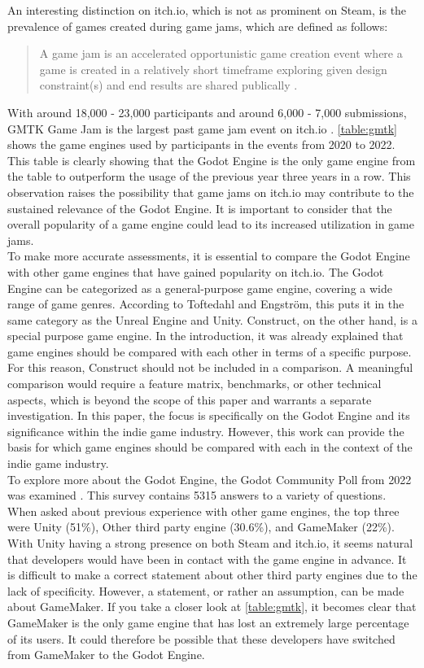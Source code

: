 An interesting distinction on itch.io, which is not as prominent on Steam, is the prevalence of games created during game jams, which are defined as follows:
\blockquote{A game jam is an accelerated opportunistic game creation event where a game is created in a relatively short timeframe exploring given design constraint(s) and end results are shared publically \cite{game-jam-definition}.}
With around 18,000 - 23,000 participants and around 6,000 - 7,000 submissions, GMTK Game Jam is the largest past game jam event on itch.io \cite{gmtk-game-jam-2021, gmtk-game-jam-2022, gmtk-game-jam-2023}.
\autoref{table:gmtk} shows the game engines used by participants in the events from 2020 to 2022.
This table is clearly showing that the Godot Engine is the only game engine from the table to outperform the usage of the previous year three years in a row.
This observation raises the possibility that game jams on itch.io may contribute to the sustained relevance of the Godot Engine.
It is important to consider that the overall popularity of a game engine could lead to its increased utilization in game jams. \\

To make more accurate assessments, it is essential to compare the Godot Engine with other game engines that have gained popularity on itch.io.
The Godot Engine can be categorized as a general-purpose game engine, covering a wide range of game genres.
According to Toftedahl and Engström, this puts it in the same category as the Unreal Engine and Unity.
Construct, on the other hand, is a special purpose game engine.
In the introduction, it was already explained that game engines should be compared with each other in terms of a specific purpose.
For this reason, Construct should not be included in a comparison.
A meaningful comparison would require a feature matrix, benchmarks, or other technical aspects, which is beyond the scope of this paper and warrants a separate investigation.
In this paper, the focus is specifically on the Godot Engine and its significance within the indie game industry.
However, this work can provide the basis for which game engines should be compared with each in the context of the indie game industry.\\

To explore more about the Godot Engine, the Godot Community Poll from 2022 was examined \cite{godot-poll-results}.
This survey contains 5315 answers to a variety of questions.
When asked about previous experience with other game engines, the top three were Unity (51\%), Other third party engine (30.6\%), and GameMaker (22\%).
With Unity having a strong presence on both Steam and itch.io, it seems natural that developers would have been in contact with the game engine in advance.
It is difficult to make a correct statement about other third party engines due to the lack of specificity.
However, a statement, or rather an assumption, can be made about GameMaker.
If you take a closer look at \autoref{table:gmtk}, it becomes clear that GameMaker is the only game engine that has lost an extremely large percentage of its users.
It could therefore be possible that these developers have switched from GameMaker to the Godot Engine.\\

